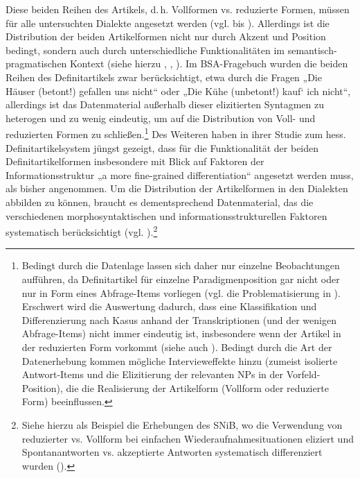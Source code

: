 Diese beiden Reihen des Artikels, d.\,h. Vollformen vs. reduzierte Formen, müssen für alle untersuchten Dialekte angesetzt werden (vgl. 	 bis ). Allerdings ist die Distribution der beiden Artikelformen nicht nur durch Akzent und Position bedingt, sondern auch durch unterschiedliche Funktionalitäten im semantisch-pragmatischen Kontext (siehe hierzu
\citealt{Eroms1989}, \citealt{Scheutz1988}, \citealt{WeißDirani2019}). Im BSA-Fragebuch wurden die beiden Reihen des Definitartikels zwar berücksichtigt, etwa durch die Fragen „Die Häuser (betont!) gefallen uns nicht“ oder „Die Kühe (unbetont!) kauf‘ ich nicht“, allerdings ist das Datenmaterial außerhalb dieser elizitierten Syntagmen zu heterogen und zu wenig eindeutig, um auf die Distribution von Voll- und reduzierten Formen zu schließen.\footnote{Bedingt durch die Datenlage lassen sich daher nur einzelne Beobachtungen aufführen, da Definitartikel für einzelne Paradigmenposition gar nicht oder nur in Form eines Abfrage-Items vorliegen (vgl. die Problematisierung in ). Erschwert wird die Auswertung dadurch, dass eine Klassifikation und Differenzierung nach Kasus anhand der Transkriptionen (und der wenigen Abfrage-Items) nicht immer eindeutig ist, insbesondere wenn der Artikel in der reduzierten Form vorkommt (siehe auch \citealt[189]{SUF3}). Bedingt durch die Art der Datenerhebung kommen mögliche Intervieweffekte hinzu (zumeist isolierte Antwort-Items und die Elizitierung der relevanten NPs in der Vorfeld-Position), die die Realisierung der Artikelform (Vollform oder reduzierte Form) beeinflussen.} Des Weiteren haben \citet[330]{WeißDirani2019} in ihrer Studie zum hess. Definitartikelsystem jüngst gezeigt, dass für die Funktionalität der beiden Definitartikelformen insbesondere mit Blick auf Faktoren der Informationsstruktur „a more fine-grained differentiation“ angesetzt werden muss, als bisher angenommen. Um die Distribution der Artikelformen in den Dialekten abbilden zu können, braucht es dementsprechend Datenmaterial, das die verschiedenen morphosyntaktischen und informationsstrukturellen Faktoren systematisch berücksichtigt (vgl. \citealt[239--240]{Scheutz1988}).\footnote{Siehe hierzu als Beispiel die Erhebungen des SNiB, wo die Verwendung von reduzierter vs. Vollform bei einfachen Wiederaufnahmesituationen eliziert und Spontanantworten vs. akzeptierte Antworten systematisch differenziert wurden (\citealt[130]{SNiB1}).}


